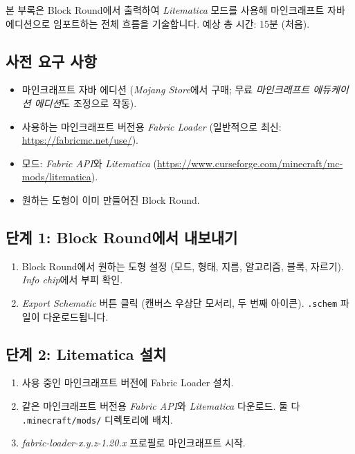 \documentclass[12pt,a4paper]{scrartcl}
\begin{document}
본 부록은 Block Round에서 출력하여 \emph{Litematica} 모드를 사용해 마인크래프트 자바 에디션으로 임포트하는 전체 흐름을 기술합니다. 예상 총 시간: 15분 (처음).

\subsection{사전 요구 사항}
\begin{itemize}[leftmargin=1.3em,itemsep=0.1em,topsep=0.2em,nosep]
  \item 마인크래프트 자바 에디션 (\emph{Mojang Store}에서 구매; 무료 \emph{마인크래프트 에듀케이션 에디션}도 조정으로 작동).
  \item 사용하는 마인크래프트 버전용 \emph{Fabric Loader} (일반적으로 최신: \url{https://fabricmc.net/use/}).
  \item 모드: \emph{Fabric API}와 \emph{Litematica} (\url{https://www.curseforge.com/minecraft/mc-mods/litematica}).
  \item 원하는 도형이 이미 만들어진 Block Round.
\end{itemize}

\subsection{단계 1: Block Round에서 내보내기}
\begin{enumerate}[leftmargin=1.5em,itemsep=0.15em,topsep=0.3em]
  \item Block Round에서 원하는 도형 설정 (모드, 형태, 지름, 알고리즘, 블록, 자르기). \emph{Info chip}에서 부피 확인.
  \item \emph{Export Schematic} 버튼 클릭 (캔버스 우상단 모서리, 두 번째 아이콘). \texttt{.schem} 파일이 다운로드됩니다.
\end{enumerate}

\subsection{단계 2: Litematica 설치}
\begin{enumerate}[leftmargin=1.5em,itemsep=0.15em,topsep=0.3em]
  \item 사용 중인 마인크래프트 버전에 Fabric Loader 설치.
  \item 같은 마인크래프트 버전용 \emph{Fabric API}와 \emph{Litematica} 다운로드. 둘 다 \texttt{.minecraft/mods/} 디렉토리에 배치.
  \item \emph{fabric-loader-x.y.z-1.20.x} 프로필로 마인크래프트 시작.
\end{enumerate}
\end{document}
